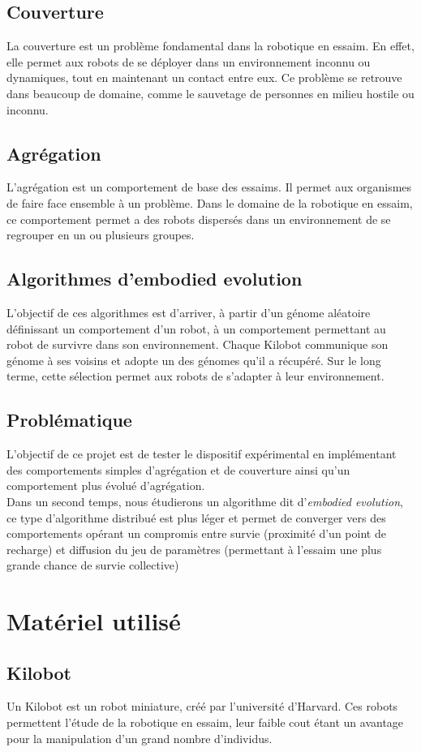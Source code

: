 \documentclass[a4paper]{article}
\begin{document}
\subsection{Couverture}
La couverture est un problème fondamental dans la robotique en essaim. En effet, elle permet aux robots de se déployer dans un environnement inconnu ou dynamiques, tout en maintenant un contact entre eux. Ce problème se retrouve dans beaucoup de domaine, comme le sauvetage de personnes en milieu hostile ou inconnu.
\subsection{Agrégation}
L'agrégation est un comportement de base des essaims. Il permet aux organismes de faire face ensemble à un problème. Dans le domaine de la robotique en essaim, ce comportement permet a des robots dispersés dans un environnement de se regrouper en un ou plusieurs groupes.
\subsection{Algorithmes d'embodied evolution}
L'objectif de ces algorithmes est d'arriver, à partir d'un génome aléatoire définissant un comportement d'un robot, à un comportement permettant au robot de survivre dans son environnement. Chaque Kilobot communique son génome à ses voisins et adopte un des génomes qu'il a récupéré. Sur le long terme, cette sélection permet aux robots de s'adapter à leur environnement.
\subsection{Problématique}
L'objectif de ce projet est de tester le dispositif expérimental en implémentant des comportements simples d'agrégation et de couverture ainsi qu'un comportement plus évolué d'agrégation. \\Dans un second temps, nous étudierons un algorithme dit d'\textit{embodied evolution}, ce type d'algorithme distribué est plus léger et permet de converger vers des comportements opérant un compromis entre survie (proximité d'un point de recharge) et diffusion du jeu de paramètres (permettant à l'essaim une plus grande chance de survie collective)
\newpage
\section{Matériel utilisé}
\subsection{Kilobot}
Un Kilobot \cite{rubenstein_kilobot:_2012} est un robot miniature, créé par l'université d'Harvard. Ces robots permettent l'étude de la robotique en essaim, leur faible cout étant un avantage pour la manipulation d'un grand nombre d'individus.
\end{document}
